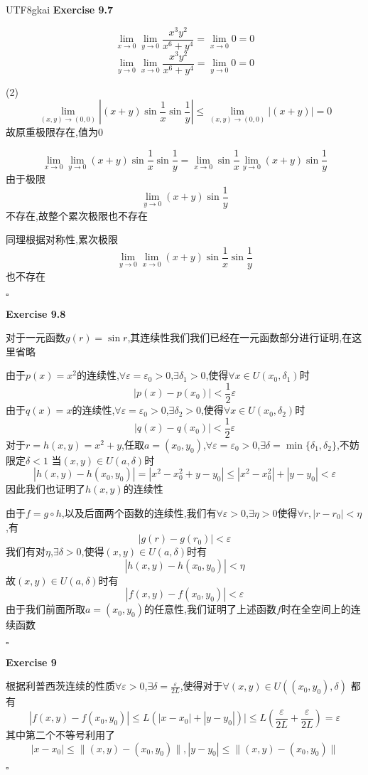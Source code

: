 \documentclass{article}
\newenvironment{exercise}[1]{%
{\textbf{Exercise #1} \\ 
    }
}{
  \hfill $\square$ 
  \par\bigskip 
}
\newcommand{\abs}[1]{\left|#1\right|}
\begin{document}
\begin{CJK}{UTF8}{gkai}
\begin{exercise}{9.7}
    \[\lim_{x \to 0} \lim_{y \to 0} \frac{x^3 y^2}{x^6 + y^4} = \lim_{x \to 0}  0 = 0\]
    \[\lim_{y \to 0} \lim_{x \to 0} \frac{x^3 y^2}{x^6 + y^4} = \lim_{y \to 0}  0 = 0\]

    (2)
    \[\lim_{(x,y)\to(0,0)}\abs{(x+y)\sin\frac{1}{x}\sin\frac{1}{y}} \leq \lim_{(x,y)\to(0,0)}\abs{(x+y)} = 0\]
    故原重极限存在,值为$0$

    \[\lim_{x \to 0} \lim_{y \to 0} (x + y)\sin\frac{1}{x}\sin \frac{1}{y} = \lim_{x \to 0} \sin\frac{1}{x} \lim_{y \to 0} (x + y)\sin \frac{1}{y}\]
    由于极限
    \[\lim_{y \to 0} (x + y)\sin \frac{1}{y}\]
    不存在,故整个累次极限也不存在

    同理根据对称性,累次极限
    \[\lim_{y \to 0} \lim_{x \to 0} (x + y)\sin\frac{1}{x}\sin \frac{1}{y} \]
    也不存在
\end{exercise}

\begin{exercise}{9.8}
    对于一元函数$g(r) = \sin r$,其连续性我们我们已经在一元函数部分进行证明,在这里省略

    由于$p(x) = x^2$的连续性,$\forall \varepsilon = \varepsilon_0 > 0$,$\exists \delta_1 > 0$,使得$\forall x \in U(x_0,\delta_1)$时
    \[|p(x) - p(x_0)| < \frac{1}{2}\varepsilon\]
    由于$q(x) = x$的连续性,$\forall \varepsilon = \varepsilon_0 > 0$,$\exists \delta_2 > 0$,使得$\forall x \in U(x_0,\delta_2)$时
    \[|q(x) - q(x_0)| < \frac{1}{2}\varepsilon\]
    对于$r = h(x,y) = x^2 + y$,任取$a = (x_0,y_0)$,$\forall \varepsilon = \varepsilon_0 > 0$,$\exists \delta = \min\{\delta_1,\delta_2\}$,不妨限定$\delta < 1$
    当$(x,y) \in U(a,\delta)$时
    \[|h(x,y) - h(x_0,y_0)| = |x^2 - x_0^2 + y - y_0| \leq |x^2 - x_0^2| + |y - y_0| < \varepsilon\]
    因此我们也证明了$h(x,y)$的连续性

    由于$f = g \circ h$,以及后面两个函数的连续性,我们有$\forall \varepsilon > 0$,$\exists \eta > 0$使得$\forall r, |r  - r_0| < \eta$,有
    \[|g(r) - g(r_0)| < \varepsilon\]
    我们有对$\eta$,$\exists \delta >0$,使得$(x,y) \in U(a,\delta)$时有
    \[|h(x,y) - h(x_0,y_0)| < \eta\]
    故$(x,y) \in U(a,\delta)$时有
    \[|f(x,y) - f(x_0,y_0)| < \varepsilon\]
    由于我们前面所取$a = (x_0,y_0)$的任意性,我们证明了上述函数$f$时在全空间上的连续函数
\end{exercise}

\begin{exercise}{9}
    根据利普西茨连续的性质$\forall \varepsilon > 0$,$\exists \delta = \frac{\varepsilon}{2L}$,使得对于$\forall (x,y) \in U((x_0,y_0),\delta)$
    都有
    \[|f(x,y) - f(x_0,y_0)| \leq L (|x - x_0| + |y - y_0|)| \leq L (\frac{\varepsilon}{2L} + \frac{\varepsilon}{2L}) = \varepsilon\]
    其中第二个不等号利用了
    \[|x - x_0| \leq \|(x,y) - (x_0,y_0)\| ,|y - y_0| \leq \|(x,y) - (x_0,y_0)\|\]
\end{exercise}


\end{CJK}
\end{document}
